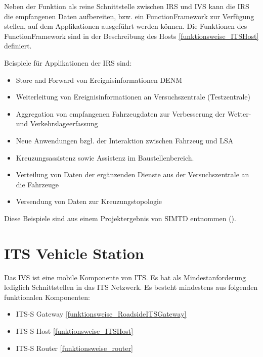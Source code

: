 Neben der Funktion als reine Schnittstelle zwischen \ac{IRS} und \ac{IVS} kann die \ac{IRS} die empfangenen Daten aufbereiten, bzw. ein FunctionFramework zur Verfügung stellen, auf dem Applikationen ausgeführt werden können. Die Funktionen des FunctionFramework sind in der Beschreibung des Hosts \ref{funktionsweise_ITSHost} definiert.  

Beispiele für Applikationen der \ac{IRS} sind:
\begin{itemize}
	\item Store and Forward von Ereignisinformationen \ac{DENM}
	\item Weiterleitung von Ereignisinformationen an Versuchszentrale (Testzentrale)
	\item Aggregation von empfangenen Fahrzeugdaten zur Verbesserung der Wetter- und Verkehrslageerfassung
	\item Neue Anwendungen bzgl. der Interaktion zwischen Fahrzeug und LSA
	\item  Kreuzungsassistenz sowie Assistenz im Baustellenbereich.
	\item Verteilung von Daten der ergänzenden Dienste aus der Versuchszentrale an die Fahrzeuge
	\item Versendung von Daten zur Kreuzungstopologie
\end{itemize}

Diese Beispiele sind aus einem Projektergebnis von \ac{SIMTD} entnommen (\cite{simtd-D12.1}). 



\section{ITS Vehicle Station}
Das \ac{IVS} ist eine mobile Komponente von \ac{ITS}. Es hat als Mindestanforderung lediglich Schnittstellen in das \ac{ITS} Netzwerk. Es besteht mindestens aus folgenden funktionalen Komponenten:
\begin{itemize}
	\item  ITS-S Gateway \ref{funktionsweise_RoadsideITSGateway}
	\item ITS-S Host \ref{funktionsweise_ITSHost}
	\item ITS-S Router \ref{funktionsweise_router} 
\end{itemize}


